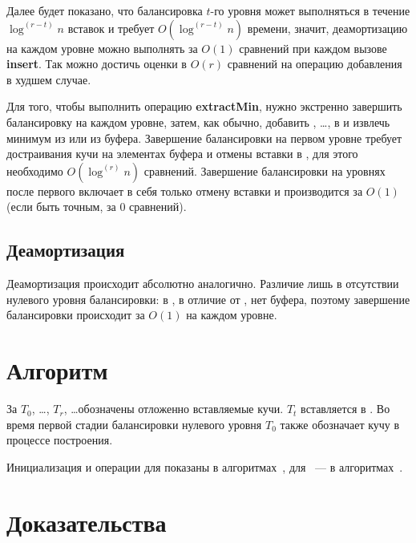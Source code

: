 Далее будет показано, что балансировка $t$-го уровня может выполняться
в течение $\log^{(r-t)}n$ вставок и требует $O(\log^{(r-t)}n)$ времени,
значит, деамортизацию на каждом уровне
можно выполнять за $O(1)$ сравнений при каждом вызове \textbf{insert}. Так можно
достичь оценки в $O(r)$ сравнений на операцию добавления в худшем случае.

Для того, чтобы выполнить операцию \textbf{extractMin}, нужно экстренно завершить
балансировку на каждом уровне, затем, как обычно, добавить \MH[1], \dots, \MH[r] в \HH
и извлечь минимум из \HH или из буфера. Завершение балансировки на первом уровне
требует достраивания кучи на элементах буфера и отмены вставки в \MH[1], для этого
необходимо $O(\log^{(r)} n)$ сравнений. Завершение балансировки на уровнях после
первого включает в себя только отмену вставки и производится за $O(1)$ (если быть
точным, за 0 сравнений).

\subsection{Деамортизация \CH[*]}
Деамортизация \CH[*] происходит абсолютно аналогично. Различие лишь в отсутствии
нулевого уровня  балансировки: в \CH[*], в отличие от \CH[r], нет буфера,
поэтому завершение балансировки происходит за $O(1)$ на каждом уровне.

\section{Алгоритм}
За $T_0$, \dots, $T_{r}$, \dots обозначены отложенно вставляемые кучи.
$T_t$ вставляется в \MH[t+1]. Во время первой стадии балансировки нулевого
уровня $T_0$ также обозначает кучу в процессе построения.

Инициализация и операции для \CH[r] показаны в
алгоритмах~, для \CH[*]~---
в алгоритмах~.


\newpage
\section{Доказательства} \label{sec:proof}

